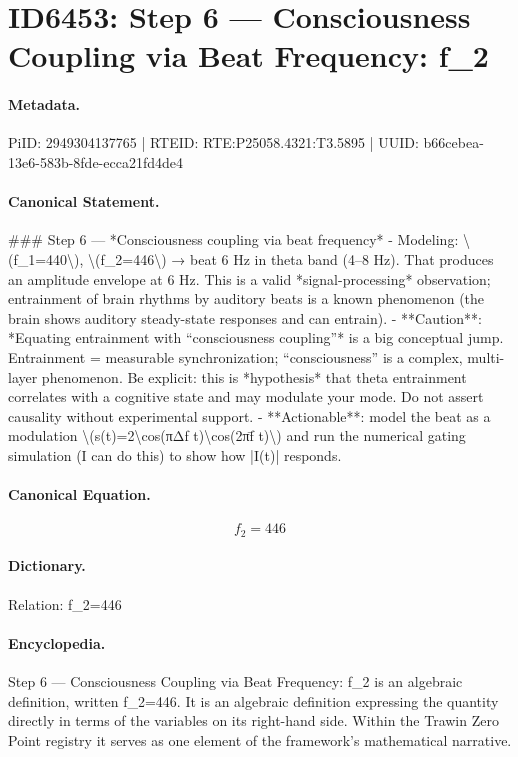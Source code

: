 \section*{ID6453: Step 6 — Consciousness Coupling via Beat Frequency: f\_2}
\paragraph{Metadata.}
PiID: 2949304137765 | RTEID: RTE:P25058.4321:T3.5895 | UUID: b66cebea-13e6-583b-8fde-ecca21fd4de4

\paragraph{Canonical Statement.}
\#\#\# Step 6 — *Consciousness coupling via beat frequency* - Modeling: \textbackslash{}(f\_1=440\textbackslash{}), \textbackslash{}(f\_2=446\textbackslash{}) → beat 6 Hz in theta band (4–8 Hz). That produces an amplitude envelope at 6 Hz. This is a valid *signal-processing* observation; entrainment of brain rhythms by auditory beats is a known phenomenon (the brain shows auditory steady-state responses and can entrain). - **Caution**: *Equating entrainment with “consciousness coupling”* is a big conceptual jump. Entrainment = measurable synchronization; “consciousness” is a complex, multi-layer phenomenon. Be explicit: this is *hypothesis* that theta entrainment correlates with a cognitive state and may modulate your mode. Do not assert causality without experimental support. - **Actionable**: model the beat as a modulation \textbackslash{}(s(t)=2\textbackslash{}cos(πΔf t)\textbackslash{}cos(2πf̄ t)\textbackslash{}) and run the numerical gating simulation (I can do this) to show how |I(t)| responds.

\paragraph{Canonical Equation.}
\[
f_2=446
\]

\paragraph{Dictionary.}
Relation: f\_2=446

\paragraph{Encyclopedia.}
Step 6 — Consciousness Coupling via Beat Frequency: f\_2 is an algebraic definition, written f\_2=446. It is an algebraic definition expressing the quantity directly in terms of the variables on its right-hand side. Within the Trawin Zero Point registry it serves as one element of the framework's mathematical narrative.
